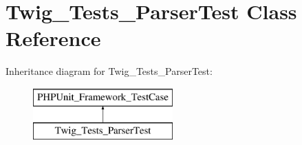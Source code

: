 \hypertarget{classTwig__Tests__ParserTest}{}\section{Twig\+\_\+\+Tests\+\_\+\+Parser\+Test Class Reference}
\label{classTwig__Tests__ParserTest}
Inheritance diagram for Twig\+\_\+\+Tests\+\_\+\+Parser\+Test\+:\begin{figure}[H]
\begin{center}
\leavevmode
\includegraphics[height=2.000000cm]{classTwig__Tests__ParserTest}
\end{center}
\end{figure}
